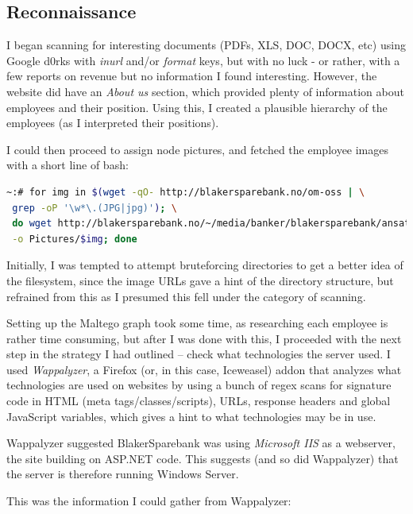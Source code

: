 \subsection{Reconnaissance}
I began scanning for interesting documents (PDFs, XLS, DOC, DOCX, etc) using Google d0rks with \textit{inurl} and/or \textit{format} keys, but with no luck - or rather, with a few reports on revenue but no information I found interesting. However, the website did have an \textit{About us} section, which provided plenty of information about employees and their position. Using this, I created a plausible hierarchy of the employees (as I interpreted their positions).

I could then proceed to assign node pictures, and fetched the employee images with a short line of bash:

\begin{lstlisting}[language=bash,caption={Fetching images}]
~:# for img in $(wget -qO- http://blakersparebank.no/om-oss | \
 grep -oP '\w*\.(JPG|jpg)'); \
 do wget http://blakersparebank.no/~/media/banker/blakersparebank/ansatte/$img \
 -o Pictures/$img; done

\end{lstlisting}

Initially, I was tempted to attempt bruteforcing directories to get a better idea of the filesystem, since the image URLs gave a hint of the directory structure, but refrained from this as I presumed this fell under the category of scanning.

Setting up the Maltego graph took some time, as researching each employee is rather time consuming, but after I was done with this, I proceeded with the next step in the strategy I had outlined -- check what technologies the server used. I used \textit{Wappalyzer}, a Firefox (or, in this case, Iceweasel) addon that analyzes what technologies are used on websites by using a bunch of regex scans for signature code in HTML (meta tags/classes/scripts), URLs, response headers and global JavaScript variables, which gives a hint to what technologies may be in use.

Wappalyzer suggested BlakerSparebank was using \textit{Microsoft IIS} as a webserver, the site building on ASP.NET code. This suggests (and so did Wappalyzer) that the server is therefore running Windows Server.

This was the information I could gather from Wappalyzer:

